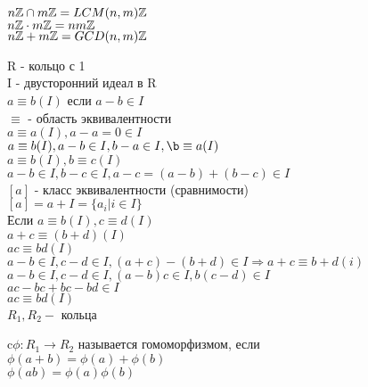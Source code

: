 $ n\mathbb{Z} \cap m\mathbb{Z}  = LCM(n,m)\mathbb{Z} $\\
$ n\mathbb{Z} \cdot m\mathbb{Z} = nm\mathbb{Z} $\\
$ n\mathbb{Z} + m\mathbb{Z} = GCD(n, m) \mathbb{Z} $ \\


R - кольцо с 1\\
I - двусторонний идеал в R \\
$ a \equiv b(I) $ если $ a - b \in I $ \\
$ \equiv $ - область эквивалентности \\
$ a \equiv a(I), a - a = 0 \in I $\\
$ a \equiv b (I) , a - b \in I, b - a \in I, \b \equiv a(I) $ \\
$ a \equiv b(I) , b \equiv c(I) $ \\
$ a - b \in I, b - c \in I, a - c = (a-b) + (b - c) \in I $ \\
$ [a] $ - класс эквивалентности (сравнимости) \\
$ [a] = a + I = \{a_i | i \in I \} $\\
Если $ a \equiv b(I), c \equiv d(I) $ \\
$ a + c \equiv (b + d)(I) $ \\
$ ac \equiv bd(I) $ \\

$ a - b  \in I, c - d \in I, (a+c) - (b+d) \in I \Rightarrow a+c \equiv b+d(i) $\\

$ a - b \in I, c - d \in I, (a-b)c \in I, b(c - d) \in I $\\
$ ac - bc + bc -bd \in I $\\
$ ac \equiv bd (I) $\\

$ R_1, R_2 - $ кольца \\
\begin{definition}
	c$ \phi : R_1 \rightarrow R_2 $ называется гомоморфизмом, если \\
	$ \phi(a+b) = \phi(a) + \phi(b)$ \\
	$ \phi(ab) = \phi(a) \phi(b) $
\end{definition}

